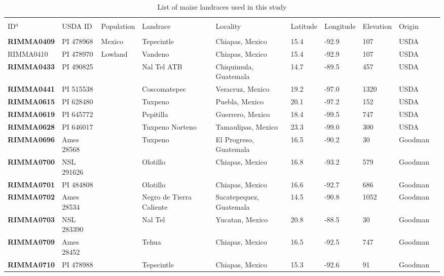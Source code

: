 \renewcommand{\arraystretch}{1.2}

\begin{table}[h]
    \begin{center}
    \caption[]{List of maize landraces used in this study\hspace*{9.1cm}}  
{\fontsize{7}{10}\selectfont
    \begin{tabular}{llllllllll}
        \hline\hline
       & & & \\[-4mm] 
	 ID$^a$	&	USDA ID	&	Population	&	Landrace	&	Locality	&	Latitude	&	Longitude	&	Elevation	&	Origin	\\[0.0cm]
	\hline 
	& & & \\[-4mm] 
{\bf RIMMA0409}	&	PI 478968	&	Mexico 	&	Tepecintle	&	Chiapas, Mexico	&	15.4 	&	-92.9 	&	107	&	USDA	\\
RIMMA0410	&	PI 478970	&	Lowland	&	Vandeno	&	Chiapas, Mexico	&	15.4 	&	-92.9 	&	107	&	USDA	\\
{\bf RIMMA0433}	&	PI 490825	&		&	Nal Tel ATB	&	Chiquimula, Guatemala	&	14.7 	&	-89.5 	&	457	&	USDA	\\
{\bf RIMMA0441}	&	PI 515538	&		&	Coscomatepec	&	Veracruz, Mexico	&	19.2 	&	-97.0 	&	1320	&	USDA	\\
{\bf RIMMA0615}	&	PI 628480	&		&	Tuxpeno	&	Puebla, Mexico	&	20.1 	&	-97.2 	&	152	&	USDA	\\
{\bf RIMMA0619}	&	PI 645772	&		&	Pepitilla	&	Guerrero, Mexico	&	18.4 	&	-99.5 	&	747	&	USDA	\\
{\bf RIMMA0628}	&	PI 646017	&		&	Tuxpeno Norteno	&	Tamaulipas, Mexico	&	23.3 	&	-99.0 	&	300	&	USDA	\\
{\bf RIMMA0696}	&	Ames 28568	&		&	Tuxpeno	&	El Progreso, Guatemala	&	16.5 	&	-90.2 	&	30	&	Goodman	\\
{\bf RIMMA0700}	&	NSL 291626	&		&	Olotillo	&	Chiapas, Mexico	&	16.8 	&	-93.2 	&	579	&	Goodman	\\
{\bf RIMMA0701}	&	PI 484808	&		&	Olotillo	&	Chiapas, Mexico	&	16.6 	&	-92.7 	&	686	&	Goodman	\\
{\bf RIMMA0702}	&	Ames 28534	&		&	Negro de Tierra Caliente	&	Sacatepequez, Guatemala	&	14.5 	&	-90.8 	&	1052	&	Goodman	\\
{\bf RIMMA0703}	&	NSL 283390	&		&	Nal Tel	&	Yucatan, Mexico	&	20.8 	&	-88.5 	&	30	&	Goodman	\\
{\bf RIMMA0709}	&	Ames 28452	&		&	Tehua	&	Chiapas, Mexico	&	16.5 	&	-92.5 	&	747	&	Goodman	\\
{\bf RIMMA0710}	&	PI 478988	&		&	Tepecintle	&	Chiapas, Mexico	&	15.3 	&	-92.6 	&	91	&	Goodman	\\

\end{tabular}}
\end{center}
\end{table}
